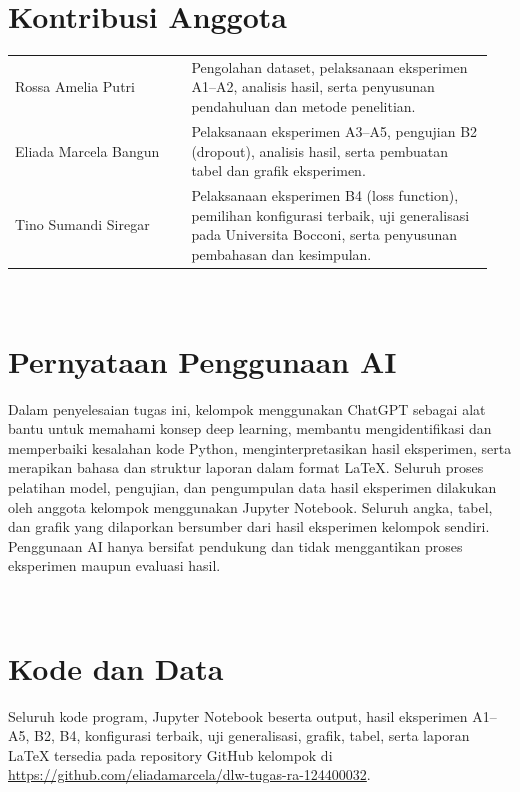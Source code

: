 \documentclass[conference,a4paper]{IEEEtran}
\begin{document}
\section*{Kontribusi Anggota}
\begin{tabular}{@{}p{0.35\linewidth}p{0.60\linewidth}@{}}
Rossa Amelia Putri & Pengolahan dataset, pelaksanaan eksperimen A1--A2, analisis hasil, serta penyusunan pendahuluan dan metode penelitian. \\
Eliada Marcela Bangun & Pelaksanaan eksperimen A3--A5, pengujian B2 (dropout), analisis hasil, serta pembuatan tabel dan grafik eksperimen. \\
Tino Sumandi Siregar & Pelaksanaan eksperimen B4 (loss function), pemilihan konfigurasi terbaik, uji generalisasi pada Universita Bocconi, serta penyusunan pembahasan dan kesimpulan. \\
\end{tabular}

\
\section*{Pernyataan Penggunaan AI}
Dalam penyelesaian tugas ini, kelompok menggunakan ChatGPT sebagai alat bantu untuk memahami konsep deep learning, membantu mengidentifikasi dan memperbaiki kesalahan kode Python, menginterpretasikan hasil eksperimen, serta merapikan bahasa dan struktur laporan dalam format LaTeX. Seluruh proses pelatihan model, pengujian, dan pengumpulan data hasil eksperimen dilakukan oleh anggota kelompok menggunakan Jupyter Notebook. Seluruh angka, tabel, dan grafik yang dilaporkan bersumber dari hasil eksperimen kelompok sendiri. Penggunaan AI hanya bersifat pendukung dan tidak menggantikan proses eksperimen maupun evaluasi hasil.

\
\section*{Kode dan Data}
Seluruh kode program, Jupyter Notebook beserta output, hasil eksperimen A1--A5, B2, B4, konfigurasi terbaik, uji generalisasi, grafik, tabel, serta laporan LaTeX tersedia pada repository GitHub kelompok di \url{https://github.com/eliadamarcela/dlw-tugas-ra-124400032}.




\end{document}
